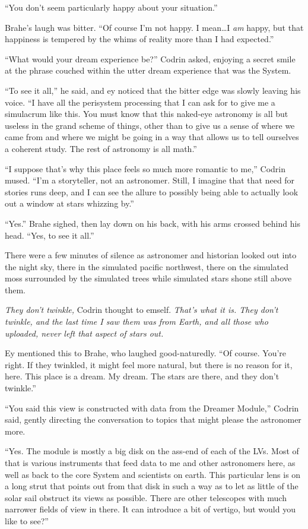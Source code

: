``You don't seem particularly happy about your situation.''

Brahe's laugh was bitter. ``Of course I'm not happy. I mean\ldots I \emph{am} happy, but that happiness is tempered by the whims of reality more than I had expected.''

``What would your dream experience be?'' Codrin asked, enjoying a secret smile at the phrase couched within the utter dream experience that was the System.

``To see it all,'' he said, and ey noticed that the bitter edge was slowly leaving his voice. ``I have all the perisystem processing that I can ask for to give me a simulacrum like this. You must know that this naked-eye astronomy is all but useless in the grand scheme of things, other than to give us a sense of where we came from and where we might be going in a way that allows us to tell ourselves a coherent study. The rest of astronomy is all math.''

``I suppose that's why this place feels so much more romantic to me,'' Codrin mused. ``I'm a storyteller, not an astronomer. Still, I imagine that that need for stories runs deep, and I can see the allure to possibly being able to actually look out a window at stars whizzing by.''

``Yes.'' Brahe sighed, then lay down on his back, with his arms crossed behind his head. ``Yes, to see it all.''

There were a few minutes of silence as astronomer and historian looked out into the night sky, there in the simulated pacific northwest, there on the simulated moss surrounded by the simulated trees while simulated stars shone still above them.

\emph{They don't twinkle,} Codrin thought to emself. \emph{That's what it is. They don't twinkle, and the last time I saw them was from Earth, and all those who uploaded, never left that aspect of stars out.}

Ey mentioned this to Brahe, who laughed good-naturedly. ``Of course. You're right. If they twinkled, it might feel more natural, but there is no reason for it, here. This place is a dream. My dream. The stars are there, and they don't twinkle.''

``You said this view is constructed with data from the Dreamer Module,'' Codrin said, gently directing the conversation to topics that might please the astronomer more.

``Yes. The module is mostly a big disk on the ass-end of each of the LVs. Most of that is various instruments that feed data to me and other astronomers here, as well as back to the core System and scientists on earth. This particular lens is on a long strut that points out from that disk in such a way as to let as little of the solar sail obstruct its views as possible. There are other telescopes with much narrower fields of view in there. It can introduce a bit of vertigo, but would you like to see?''

